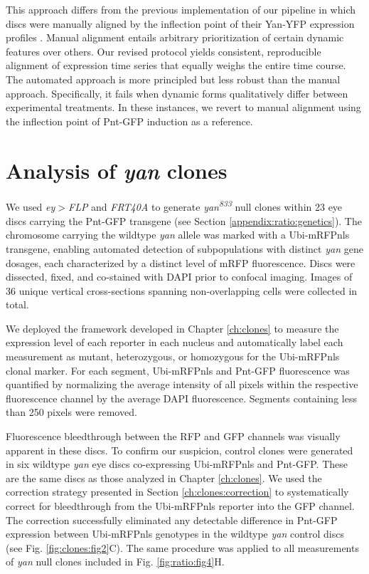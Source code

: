 This approach differs from the previous implementation of our pipeline in which discs were manually aligned by the inflection point of their Yan-YFP expression profiles \cite{Pelaez2015a}. Manual alignment entails arbitrary prioritization of certain dynamic features over others. Our revised protocol yields consistent, reproducible alignment of expression time series that equally weighs the entire time course. The automated approach is more principled but less robust than the manual approach. Specifically, it fails when dynamic forms qualitatively differ between experimental treatments. In these instances, we revert to manual alignment using the inflection point of Pnt-GFP induction as a reference.

\section{Analysis of \textit{yan} clones}
\label{appendix:ratio:clones}

We used \textit{ey$>$FLP} and \textit{FRT40A} to generate \textit{yan\textsuperscript{833}} null clones within 23 eye discs carrying the Pnt-GFP transgene (see Section \ref{appendix:ratio:genetics}). The chromosome carrying the wildtype \textit{yan} allele was marked with a Ubi-mRFPnls transgene, enabling automated detection of subpopulations with distinct \textit{yan} gene dosages, each characterized by a distinct level of mRFP fluorescence. Discs were dissected, fixed, and co-stained with DAPI prior to confocal imaging. Images of 36 unique vertical cross-sections spanning non-overlapping cells were collected in total. 

We deployed the framework developed in Chapter \ref{ch:clones} to measure the expression level of each reporter in each nucleus and automatically label each measurement as mutant, heterozygous, or homozygous for the Ubi-mRFPnls clonal marker. For each segment, Ubi-mRFPnls and Pnt-GFP fluorescence was quantified by normalizing the average intensity of all pixels within the respective fluorescence channel by the average DAPI fluorescence. Segments containing less than 250 pixels were removed. 

Fluorescence bleedthrough between the RFP and GFP channels was visually apparent in these discs. To confirm our suspicion, control clones were generated in six wildtype \textit{yan} eye discs co-expressing Ubi-mRFPnls and Pnt-GFP. These are the same discs as those analyzed in Chapter \ref{ch:clones}. We used the correction strategy presented in Section \ref{ch:clones:correction} to systematically correct for bleedthrough from the Ubi-mRFPnls reporter into the GFP channel. The correction successfully eliminated any detectable difference in Pnt-GFP expression between Ubi-mRFPnls genotypes in the wildtype \textit{yan} control discs (see Fig. \ref{fig:clones:fig2}C). The same procedure was applied to all measurements of \textit{yan} null clones included in Fig. \ref{fig:ratio:fig4}H.


